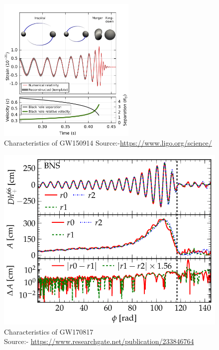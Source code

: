 \begin{figure}[h]
    \centering
    \includegraphics[height = 7cm, width = 8 cm]{images.tex/GW150914.png}
    \caption{Characteristics of GW150914   Source:-\url{https://www.ligo.org/science/}}
\end{figure}

\begin{figure}[h]
     \centering
     \includegraphics[scale = 0.3]{images.tex/GW170817.png}
     \caption{Characteristics of GW170817\\ Source:- \url{https://www.researchgate.net/publication/233846764}}
\end{figure}

\pagebreak